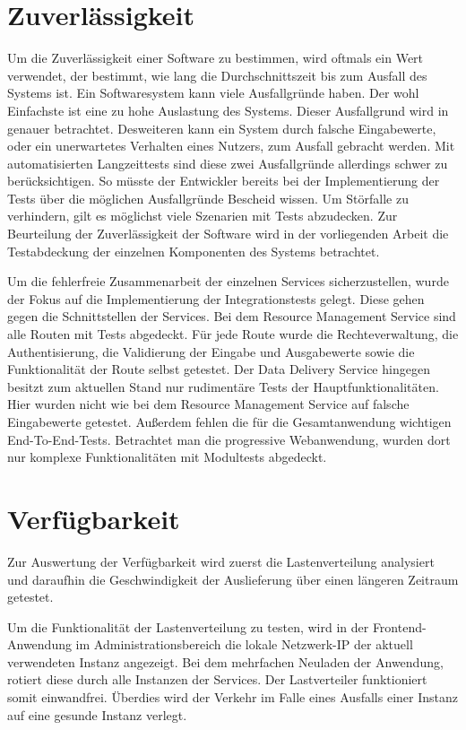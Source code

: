 \section{Zuverlässigkeit}
\label{sec:zuverlaessigkeit}
Um die Zuverlässigkeit einer Software zu bestimmen, wird oftmals ein Wert verwendet,
der bestimmt, wie lang die Durchschnittszeit bis zum Ausfall des Systems ist.\cite[S. 9]{SoftwareQualitaet}
Ein Softwaresystem kann viele Ausfallgründe haben. Der wohl Einfachste ist eine zu hohe Auslastung des Systems.
Dieser Ausfallgrund wird in  genauer betrachtet. Desweiteren kann ein System durch falsche
Eingabewerte, oder ein unerwartetes Verhalten eines Nutzers, zum Ausfall gebracht werden. Mit automatisierten Langzeittests
sind diese zwei Ausfallgründe allerdings schwer zu berücksichtigen. So müsste der Entwickler bereits bei der Implementierung
der Tests über die möglichen Ausfallgründe Bescheid wissen. Um Störfalle zu verhindern, gilt es möglichst viele Szenarien mit
Tests abzudecken. Zur Beurteilung der Zuverlässigkeit der Software wird in der vorliegenden Arbeit die
Testabdeckung der einzelnen Komponenten des Systems betrachtet.

Um die fehlerfreie Zusammenarbeit der einzelnen Services sicherzustellen,
wurde der Fokus auf die Implementierung der Integrationstests gelegt.
Diese gehen gegen die Schnittstellen der Services. Bei dem Resource Management Service
sind alle Routen mit Tests abgedeckt. Für jede Route wurde die Rechteverwaltung,
die Authentisierung, die Validierung der Eingabe und Ausgabewerte sowie die Funktionalität der Route selbst getestet.
Der Data Delivery Service hingegen besitzt zum aktuellen Stand nur rudimentäre Tests der Hauptfunktionalitäten.
Hier wurden nicht wie bei dem Resource Management Service auf falsche Eingabewerte getestet. Außerdem fehlen die für
die Gesamtanwendung wichtigen End-To-End-Tests. Betrachtet man die progressive Webanwendung, wurden dort nur komplexe
Funktionalitäten mit Modultests abgedeckt.

\section{Verfügbarkeit}
\label{sec:verfuegbarkeit}
Zur Auswertung der Verfügbarkeit wird zuerst die Lastenverteilung analysiert und daraufhin
die Geschwindigkeit der Auslieferung über einen längeren Zeitraum getestet.

Um die Funktionalität der Lastenverteilung zu testen, wird in der Frontend-Anwendung
im Administrationsbereich die lokale Netzwerk-IP der aktuell verwendeten Instanz
angezeigt. Bei dem mehrfachen Neuladen der Anwendung, rotiert diese
durch alle Instanzen der Services. Der Lastverteiler funktioniert somit einwandfrei.
Überdies wird der Verkehr im Falle eines Ausfalls einer Instanz auf eine gesunde
Instanz verlegt.

